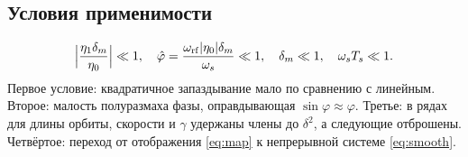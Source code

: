 \subsection{Условия применимости}

\begin{equation}
\label{eq:valid}
\Bigl|\frac{\eta_1\delta_m}{\eta_0}\Bigr|\ll 1,
\quad
\hat\varphi=\frac{\omega_{\mathrm{rf}}|\eta_0|\delta_m}{\omega_s}\ll 1,
\quad
\delta_m\ll 1,
\quad
\omega_s T_s\ll 1.
\end{equation}
Первое условие: квадратичное запаздывание мало по сравнению с линейным. Второе: малость полуразмаха фазы, оправдывающая $\sin\varphi\approx\varphi$. Третье: в рядах для длины орбиты, скорости и $\gamma$ удержаны члены до $\delta^2$, а следующие отброшены. Четвёртое: переход от отображения \eqref{eq:map} к непрерывной системе \eqref{eq:smooth}.
